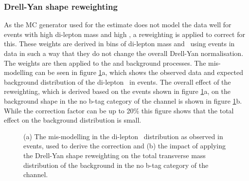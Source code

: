 \subsubsection*{Drell-Yan shape reweighting}
As the \ac{MC} generator used for the \Ztautau estimate
does not model the data well for events with high di-lepton
mass and high \pT, a reweighting is applied to correct for this.
These weights are derived in bins of di-lepton mass and 
\pT~using \Zmm events in data in such a way that they do not
change the overall Drell-Yan normalisation. The weights
are then applied to the \Ztautau and \Zellell background processes.
The mis-modelling can be seen in figure \ref{fig:dyrwt}a, which
shows the observed data and expected background distribution of the di-lepton \pT~in
\Zmm events. The overall effect of the reweighting, which is derived
based on the events shown in figure \ref{fig:dyrwt}a, on the \Ztautau background
shape in the no b-tag category of the \etau channel is shown in figure \ref{fig:dyrwt}b.
While the correction factor can be up to 20\% this figure shows
that the total effect on the \Ztautau background distribution is small.
\begin{figure}[h!]
\begin{center}
\end{center}
\caption[The mis-modelling in the di-lepton \pT~distribution as observed
in \mbox{\Zmm} events, and the impact of applying the Drell-Yan shape reweighting
on the total transverse mass distribution of the \Ztautau background in the no b-tag category of the \etau channel.]{(a) The mis-modelling in the di-lepton \pT~distribution as observed
in \Zmm events, used to derive the correction and (b) the impact of applying the Drell-Yan shape
reweighting on the total transverse
mass distribution of the \Ztautau background in the no b-tag category of the \etau channel.}
\label{fig:dyrwt}
\end{figure}


